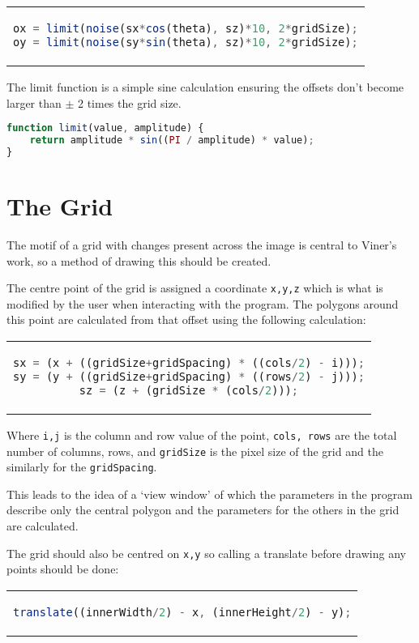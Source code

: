 \begin{center}
\begin{tabular}{c}
\begin{lstlisting}[language=JavaScript]
ox = limit(noise(sx*cos(theta), sz)*10, 2*gridSize);
oy = limit(noise(sy*sin(theta), sz)*10, 2*gridSize);
\end{lstlisting}
\end{tabular}
\end{center}

The limit function is a simple sine calculation ensuring the offsets don't become
larger than $\pm$ 2 times the grid size.

\begin{lstlisting}[language=JavaScript]
function limit(value, amplitude) {
    return amplitude * sin((PI / amplitude) * value);
}
\end{lstlisting}

\section{The Grid}
The motif of a grid with changes present across the image is central to Viner's
work, so a method of drawing this should be created.

The centre point of the grid is assigned a coordinate \verb|x,y,z| which is what
is modified by the user when interacting with the program. The polygons around
this point are calculated from that offset using the following calculation:

\begin{center}
\begin{tabular}{c}
\begin{lstlisting}[language=JavaScript]
sx = (x + ((gridSize+gridSpacing) * ((cols/2) - i)));
sy = (y + ((gridSize+gridSpacing) * ((rows/2) - j)));
sz = (z + (gridSize * (cols/2)));
\end{lstlisting}
\end{tabular}
\end{center}

Where \verb|i,j| is the column and row value of the point, \verb|cols, rows|
are the total number of columns, rows, and \verb|gridSize| is the pixel size
of the grid and the similarly for the \verb|gridSpacing|. 

This leads to the idea of a `view window' of which the parameters in the program
describe only the central polygon and the parameters for the others in the grid
are calculated.

The grid should also be centred on \verb|x,y| so calling a translate before
drawing any points should be done:
\begin{center}
\begin{tabular}{c}
\begin{lstlisting}[language=JavaScript]
translate((innerWidth/2) - x, (innerHeight/2) - y);
\end{lstlisting}
\end{tabular}
\end{center}


